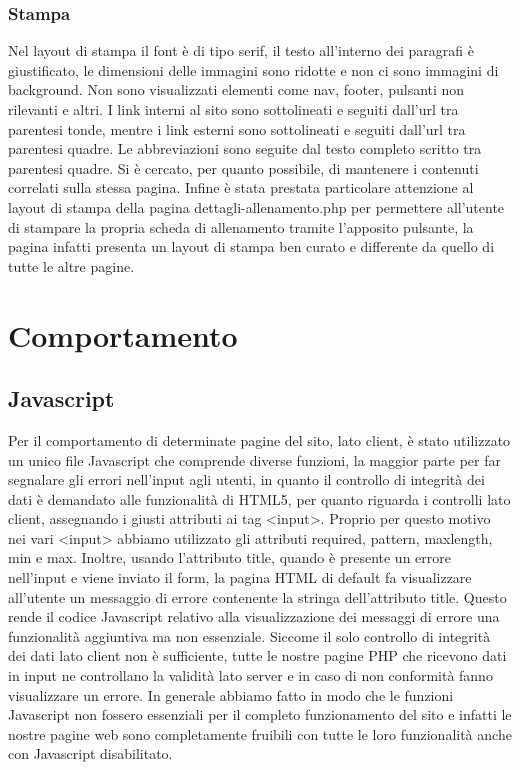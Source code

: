 \documentclass[a4paper]{article}
\begin{document}
	\subsubsection{Stampa}
	Nel layout di stampa il font è di tipo serif, il testo all'interno dei paragrafi è giustificato, le dimensioni delle immagini sono ridotte e non ci sono immagini di background. Non sono visualizzati elementi come nav, footer, pulsanti non rilevanti e altri. I link interni al sito sono sottolineati e seguiti dall'url tra parentesi tonde, mentre i link esterni sono sottolineati e seguiti dall'url tra parentesi quadre. Le abbreviazioni sono seguite dal testo completo scritto tra parentesi quadre. Si è cercato, per quanto possibile, di mantenere i contenuti correlati sulla stessa pagina. Infine è stata prestata particolare attenzione al layout di stampa della pagina dettagli-allenamento.php per permettere all'utente di stampare la propria scheda di allenamento tramite l'apposito pulsante, la pagina infatti presenta un layout di stampa ben curato e differente da quello di tutte le altre pagine.

	\section{Comportamento}

	\subsection{Javascript}
	Per il comportamento di determinate pagine del sito, lato client, è stato utilizzato un unico file Javascript che comprende diverse funzioni, la maggior parte per far segnalare gli errori nell'input agli utenti, in quanto il controllo di integrità dei dati è demandato alle funzionalità di HTML5, per quanto riguarda i controlli lato client, assegnando i giusti attributi ai tag <input>. Proprio per questo motivo nei vari <input> abbiamo utilizzato gli attributi required, pattern, maxlength, min e max. Inoltre, usando l'attributo title, quando è presente un errore nell'input e viene inviato il form, la pagina HTML di default fa visualizzare all'utente un messaggio di errore contenente la stringa dell'attributo title. Questo rende il codice Javascript relativo alla visualizzazione dei messaggi di errore una funzionalità aggiuntiva ma non essenziale. Siccome il solo controllo di integrità dei dati lato client non è sufficiente, tutte le nostre pagine PHP che ricevono dati in input ne controllano la validità lato server e in caso di non conformità fanno visualizzare un errore.  In generale abbiamo fatto in modo che le funzioni Javascript non fossero essenziali per il completo funzionamento del sito e  infatti le nostre pagine web sono completamente fruibili con tutte le loro funzionalità anche con Javascript disabilitato.
\end{document}
